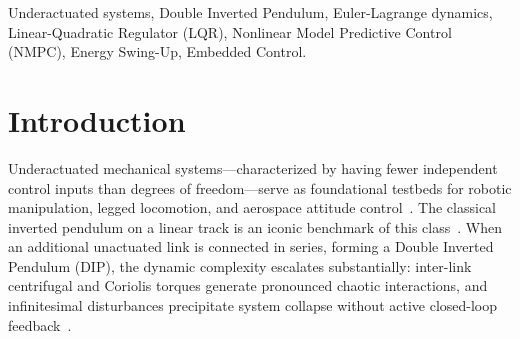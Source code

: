 \documentclass[conference]{IEEEtran}
\begin{document}
\begin{abstract}
The inverted pendulum on a movable cart is an underactuated, open-loop unstable dynamical benchmark in modern control theory and robotics. Expanding the configuration from a single link to multiple links introduces strong nonlinear cross-coupling, severe sensitivity to external disturbances, and chaotic state-space dynamics. This paper presents an integrated engineering workflow for the modeling, simulation, and optimal control of both single and double inverted pendulum systems mounted on a motorized linear cart. Utilizing the Euler-Lagrange formalism, the full nonlinear equations of motion are derived, followed by local linearization around the upright equilibrium to construct state-space representations. After confirming full controllability via the Kalman rank criterion, continuous-time Linear-Quadratic Regulators (LQR) are synthesized by solving the Algebraic Riccati Equation for balancing. To address the narrow basin of attraction of linear regulators, an energy-based Lyapunov swing-up controller is developed for the single cart-pole system, while an energy-optimal Nonlinear Model Predictive Control (NMPC) scheme using CasADi and IPOPT is designed for offline swing-up trajectory generation of the double pendulum. The resulting hybrid control architectures are validated within 60~FPS interactive real-time simulators powered by 4th-order Runge-Kutta integration, and translated into an embedded C/C++ control routine suitable for microcontroller execution.
\end{abstract}

\begin{IEEEkeywords}
Underactuated systems, Double Inverted Pendulum, Euler-Lagrange dynamics, Linear-Quadratic Regulator (LQR), Nonlinear Model Predictive Control (NMPC), Energy Swing-Up, Embedded Control.
\end{IEEEkeywords}

\section{Introduction}
Underactuated mechanical systems---characterized by having fewer independent control inputs than degrees of freedom---serve as foundational testbeds for robotic manipulation, legged locomotion, and aerospace attitude control~\cite{ref_brunton, ref_den}. The classical inverted pendulum on a linear track is an iconic benchmark of this class~\cite{ref_astrom}. When an additional unactuated link is connected in series, forming a Double Inverted Pendulum (DIP), the dynamic complexity escalates substantially: inter-link centrifugal and Coriolis torques generate pronounced chaotic interactions, and infinitesimal disturbances precipitate system collapse without active closed-loop feedback~\cite{ref_spong, ref_den}.
\end{document}
